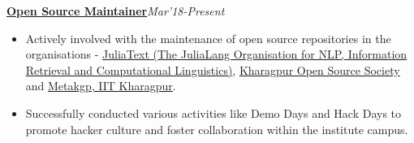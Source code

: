 \documentclass[a4paper,10pt]{extarticle} %
\begin{document}
\textbf{\href{https://github.com/Ayushk4}{Open Source Maintainer}}\hfill\textit{\small{Mar'18-Present}}
    \begin{itemize}[leftmargin=.15in]
        \item Actively involved with the maintenance of open source repositories in the organisations -  \href{https://github.com/JuliaText}{JuliaText (The JuliaLang Organisation for NLP, Information Retrieval and Computational Linguistics)}, \href{https://github.com/kossiitkgp}{Kharagpur Open Source Society} and \href{https://github.com/metakgp}{Metakgp, IIT Kharagpur}.
        \item Successfully conducted various activities like Demo Days and Hack Days to promote hacker culture and foster collaboration within the institute campus. \\
    \end{itemize}

\end{document}
